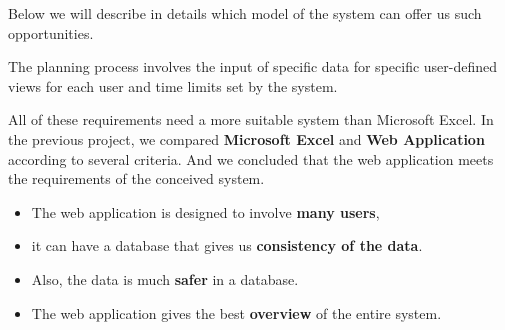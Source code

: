 \documentclass{scrartcl}
\begin{document}
Below we will describe in details which model of the system can offer us such opportunities.

The planning process involves the input of specific data for specific user-defined views for each user and time limits set by the system. 

 All of these requirements need a more suitable system than Microsoft Excel.
In the previous project, we compared \textbf{Microsoft Excel} and \textbf{Web Application} according to several criteria. And we concluded that the web application meets the requirements of the conceived system. 
\begin{itemize}
    \item The web application is designed to involve \textbf{many users}, 
    \item it can have a  database that gives us  \textbf{consistency of the data}. 
    \item Also, the data is much \textbf{safer} in a database.  
    \item The web application gives the best \textbf{overview} of the entire system.
\end{itemize}
\end{document}
